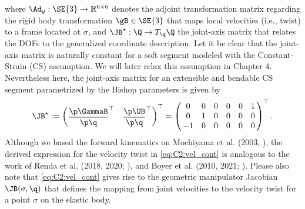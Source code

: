 %
where $\Ad_g: \SE{3} \to \mathbb{R}^{6\times 6}$ denotes the adjoint transformation matrix regarding the rigid body transformation $\gB \in \SE{3}$ that maps local velocities (i.e., twist) to a frame located at $\sigma$, and $\JB^\star:\Q \to T_{\q}\Q$ the joint-axis matrix that relates the DOFs to the generalized coordinate description. Let it be clear that the joint-axis matrix is naturally constant for a soft segment modeled with the Constant-Strain (CS) assumption. We will later relax this assumption in Chapter 4. Nevertheless here, the joint-axis matrix for an extensible and bendable CS segment parametrized by the Bishop parameters is given by
%
\begin{align}
\renewcommand*{\arraystretch}{1}{}
\JB^\star := \begin{pmatrix}\dfrac{\p \GammaB}{\p \q}^\top & \dfrac{\p \UB}{\p \q}^\top \end{pmatrix}^\top  = \begin{pmatrix}
\,0 & 0 & 0 & 0 & 0 & 1 \, \\
\,0 & 1 & 0 & 0 & 0 & 0 \,  \\
\,-1 & 0 & 0 & 0 & 0 & 0 \,  \\
\end{pmatrix}^\top. \label{eq:C2:joint-axis-matrix}
\end{align}
%
Although we based the forward kinematics on Mochiyama et al. (2003, \cite{Mochiyama2003}), the derived expression for the velocity twist in \eqref{eq:C2:vel_cont} is analogous to the work of Renda et al. (2018, 2020; \cite{Renda2018,Renda2020}), and Boyer et al. (2010, 2021; \cite{Boyer2010,Boyer2021}). Please also note that
\eqref{eq:C2:vel_cont} gives rise to the geometric manipulator Jacobian $\JB(\sigma,\q)$ that defines the mapping from joint velocities to the velocity twist for a point $\sigma$ on the elastic body.

